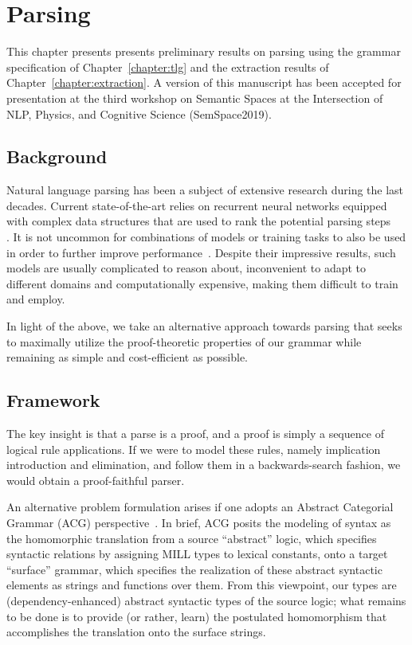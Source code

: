 \chapter{Parsing}
\label{chapter:parsing}

This chapter presents presents preliminary results on parsing using the grammar specification of Chapter~\ref{chapter:tlg} and the extraction results of Chapter~\ref{chapter:extraction}.
A version of this manuscript has been accepted for presentation at the third workshop on Semantic Spaces at the Intersection of NLP, Physics, and Cognitive Science (SemSpace2019).

\section{Background}
Natural language parsing has been a subject of extensive research during the last decades.
Current state-of-the-art relies on recurrent neural networks equipped with complex data structures that are used to rank the potential parsing steps~\\\cite{dyer-etal-2016-recurrent, dozat2016deep, liu-zhang-2017-order}.
It is not uncommon for combinations of models or training tasks to also be used in order to further improve performance~\cite{clark2018semi, fried2017improving}.
Despite their impressive results, such models are usually complicated to reason about, inconvenient to adapt to different domains and computationally expensive, making them difficult to train and employ.

In light of the above, we take an alternative approach towards parsing that seeks to maximally utilize the proof-theoretic properties of our grammar while remaining as simple and cost-efficient as possible.

\section{Framework}
The key insight is that a parse is a proof, and a proof is simply a sequence of logical rule applications.
If we were to model these rules, namely implication introduction and elimination, and follow them in a backwards-search fashion, we would obtain a proof-faithful parser.

An alternative problem formulation arises if one adopts an Abstract Categorial Grammar (ACG) perspective~\cite{de2001towards}.
In brief, ACG posits the modeling of syntax as the homomorphic translation from a source ``abstract'' logic, which specifies syntactic relations by assigning MILL types to lexical constants, onto a target ``surface'' grammar, which specifies the realization of these abstract syntactic elements as strings and functions over them.
From this viewpoint, our types are (dependency-enhanced) abstract syntactic types of the source logic; what remains to be done is to provide (or rather, learn) the postulated homomorphism that accomplishes the translation onto the surface strings.

